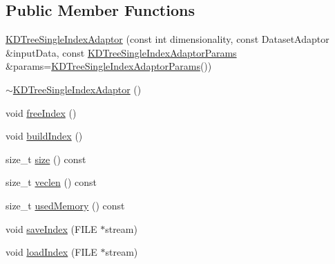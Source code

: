 \subsection*{Public Member Functions}
\begin{DoxyCompactItemize}
\item 
\hyperlink{classSph_1_1KDTreeSingleIndexAdaptor_a095fe85253e99a45f533ac830b7f69c3}{K\+D\+Tree\+Single\+Index\+Adaptor} (const int dimensionality, const Dataset\+Adaptor \&input\+Data, const \hyperlink{structSph_1_1KDTreeSingleIndexAdaptorParams}{K\+D\+Tree\+Single\+Index\+Adaptor\+Params} \&params=\hyperlink{structSph_1_1KDTreeSingleIndexAdaptorParams}{K\+D\+Tree\+Single\+Index\+Adaptor\+Params}())
\item 
\hyperlink{classSph_1_1KDTreeSingleIndexAdaptor_a809ad0ae1a688dd8f9870236a3157788}{$\sim$\+K\+D\+Tree\+Single\+Index\+Adaptor} ()
\item 
void \hyperlink{classSph_1_1KDTreeSingleIndexAdaptor_a977528560c451d99bc006f3a2084b0a4}{free\+Index} ()
\item 
void \hyperlink{classSph_1_1KDTreeSingleIndexAdaptor_a9806520fd7f6a35557d4c52043459358}{build\+Index} ()
\item 
size\+\_\+t \hyperlink{classSph_1_1KDTreeSingleIndexAdaptor_a48c011ca89a6a97693b7ba78e112d32c}{size} () const
\item 
size\+\_\+t \hyperlink{classSph_1_1KDTreeSingleIndexAdaptor_a3bdc53d8655e9e60c52fffc4fc4ce4dc}{veclen} () const
\item 
size\+\_\+t \hyperlink{classSph_1_1KDTreeSingleIndexAdaptor_a0f9d01c30153a3831103ba5381429e10}{used\+Memory} () const
\item 
void \hyperlink{classSph_1_1KDTreeSingleIndexAdaptor_adb51e3a0ffcdaf32a9153e82339070c1}{save\+Index} (F\+I\+LE $\ast$stream)
\item 
void \hyperlink{classSph_1_1KDTreeSingleIndexAdaptor_a0509f8a856bb3c6d278a182c5e6ce654}{load\+Index} (F\+I\+LE $\ast$stream)
\end{DoxyCompactItemize}
